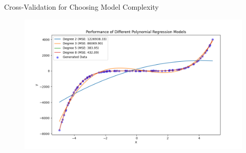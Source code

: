 \documentclass[serif, aspectratio=169]{beamer}
\begin{document}
\begin{frame}{Cross-Validation for Choosing Model Complexity}
    \begin{figure}
        \centering
        \includegraphics[width=0.8\linewidth]{pic/Figure_16.png}
    \end{figure}
\end{frame}






\begin{frame}[allowframebreaks]
    
    
    \nocite{*} %
\end{frame}
\end{document}
